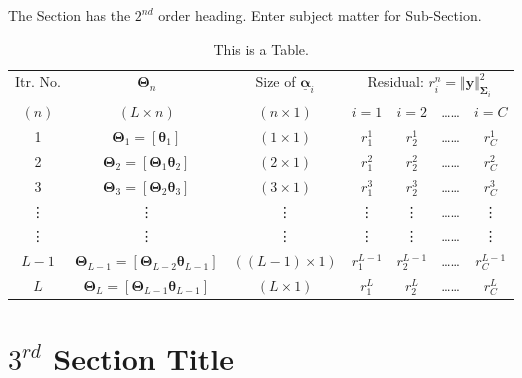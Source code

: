 {{The Section has the $2^{nd}$ order heading. Enter subject matter for Sub-Section.}

\begin{table}[h]
\centering
\begin{tabular}{|c|c|c|c|c|c|c|}
\hline
Itr. No. & $\boldsymbol \Theta_n$ & Size of $\underline{\boldsymbol \alpha}_i$ & \multicolumn{4}{c|}{Residual: $r_i^n = \Vert \mathbf{y} \Vert_{\boldsymbol \Sigma_i}^{2}$ }\\ \cline{4-7}
$(n)$ & $(L \times n)$ & $(n \times 1)$ &
$i=1$ & $i=2$ & \dots \dots & $i=C$ \\
\hline
1 & $\boldsymbol \Theta_1 = [\boldsymbol \theta_1]$ & $(1 \times 1)$ & $r_1^1$
& $r_2^1$
& \dots \dots & $r_C^1$ \\
\hline
2 & $\boldsymbol \Theta_2 = [\boldsymbol \Theta_1 \boldsymbol \theta_2]$ & $(2 \times 1)$ &  $r_1^2$ & $r_2^2$
& \dots \dots & $r_C^2$  \\
\hline
3 & $\boldsymbol \Theta_3 = [\boldsymbol \Theta_2 {\boldsymbol \theta_3}]$ & $(3 \times 1)$ & $r_1^3$ & $r_2^3$
& \dots \dots & $r_C^3$  \\
\hline
\vdots & \vdots & \vdots & \vdots & \vdots & \dots \dots & \vdots \\
\vdots & \vdots & \vdots & \vdots & \vdots & \dots \dots & \vdots \\
\hline
$L-1$ & $\boldsymbol \Theta_{L-1} = [\boldsymbol \Theta_{L-2} {\boldsymbol \theta_{L-1}}]$ & $((L-1) \times 1)$ & $r_1^{L-1}$ & $r_2^{L-1}$
& \dots \dots & $r_C^{L-1}$\\
\hline
$L$ & $\boldsymbol \Theta_L = [\boldsymbol \Theta_{L-1} {\boldsymbol \theta_{L-1}}]$ & $(L \times 1)$ &  $r_1^L$ & $r_2^L$
& \dots \dots & $r_C^L$  \\
\hline
\end{tabular}
\caption{This is a Table.}
\label{tab:Table}
\end{table}



\section{$3^{rd}$ Section Title}
\label{}

}

